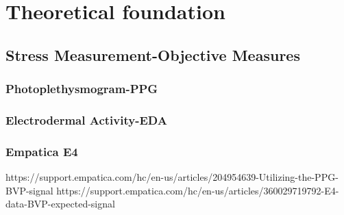 \chapter{Theoretical foundation}

\section{Stress Measurement-Objective Measures}
\subsection{Photoplethysmogram-PPG}
\subsection{Electrodermal Activity-EDA}
\subsection{Empatica E4}
https://support.empatica.com/hc/en-us/articles/204954639-Utilizing-the-PPG-BVP-signal
https://support.empatica.com/hc/en-us/articles/360029719792-E4-data-BVP-expected-signal

